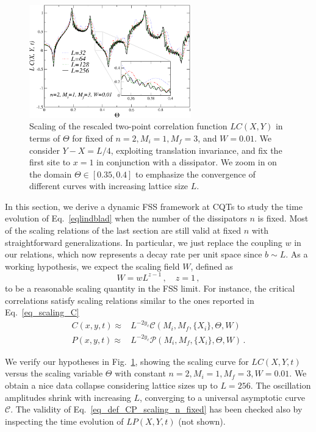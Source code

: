 \begin{figure}
    \centering
    \includegraphics[width=7cm]{imm/fssnfixed2n.pdf}
    \caption{Scaling of the rescaled two-point correlation function $L C(X, Y)$ in terms of $\Theta$ for fixed of $n=2, M_i=1, M_f=3$, and $W=0.01$. We consider $Y-X=L/4$, exploiting translation invariance, and fix the first site to $x=1$ in conjunction with a dissipator. We zoom in on the domain $\Theta\in[0.35, 0.4]$ to emphasize the convergence of different curves with increasing lattice size $L$.}
    \label{fig_fss_2n_fixed}
\end{figure}

In this section, we derive a dynamic FSS framework at CQTs to study the time evolution of Eq.~\eqref{eqlindblad} when the number of the dissipators $n$ is fixed. Most of the scaling relations of the last section are still valid at fixed $n$ with straightforward generalizations. In particular, we just replace the coupling $w$ in our relations, which now represents a decay rate per unit space since $b\sim L$. As a working hypothesis, we expect the scaling field $W$, defined as
\begin{equation}
    W = w L^{z-1}\,, \quad z=1\,,
    \label{eq_def_scaling_variable_W}
\end{equation}
to be a reasonable scaling quantity in the FSS limit. 
For instance, the critical correlations satisfy scaling relations similar to the ones reported in Eq.~\eqref{eq_scaling_C}
\begin{align}
    C(x, y, t)\approx& L^{-2y_c}\mathcal{C}(M_i, M_f, \{X_i\}, \Theta, W)\\
    P(x, y, t)\approx& L^{-2y_c}\mathcal{P}
    (M_i, M_f, \{X_i\}, \Theta, W)\,.
    \label{eq_def_CP_scaling_n_fixed}
\end{align}

We verify our hypotheses in Fig.~\ref{fig_fss_2n_fixed}, showing the scaling curve for $L C(X, Y, t)$ versus the scaling variable $\Theta$ with constant $n=2, M_i=1, M_f=3, W=0.01$. We obtain a nice data collapse considering lattice sizes up to $L=256$. The oscillation amplitudes shrink with increasing $L$, converging to a universal asymptotic curve $\mathcal{C}$. The validity of Eq.~\eqref{eq_def_CP_scaling_n_fixed} has been checked also by inspecting the time evolution of $L P(X, Y, t)$ (not shown).




